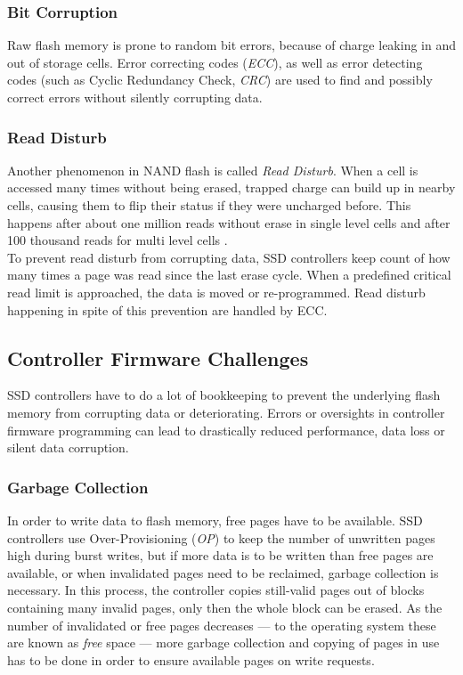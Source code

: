 \documentclass{acm_proc_article-sp}
\begin{document}
\subsubsection*{Bit Corruption}
Raw flash memory is prone to random bit errors, because of charge leaking in and out of storage cells. Error correcting codes (\emph{ECC}), as well as error detecting codes (such as Cyclic Redundancy Check, \emph{CRC}) are used to find and possibly correct errors without silently corrupting data.

\subsubsection*{Read Disturb}
Another phenomenon in NAND flash is called \emph{Read Disturb}. When a cell is accessed many times without being erased, trapped charge can build up in nearby cells, causing them to flip their status if they were uncharged before.
This happens after about one million reads without erase in single level cells and after 100 thousand reads for multi level cells \cite{cooke2007inconvenient}.
\\
To prevent read disturb from corrupting data, SSD controllers keep count of how many times a page was read since the last erase cycle. When a predefined critical read limit is approached, the data is moved or re-programmed. Read disturb happening in spite of this prevention are handled by ECC.

\subsection{Controller Firmware Challenges}
SSD controllers have to do a lot of bookkeeping to prevent the underlying flash memory from corrupting data or deteriorating. Errors or oversights in controller firmware programming can lead to drastically reduced performance, data loss or silent data corruption.

\subsubsection*{Garbage Collection}
In order to write data to flash memory, free pages have to be available. SSD controllers use Over-Provisioning (\emph{OP}) to keep the number of unwritten pages high during burst writes, but if more data is to be written than free pages are available, or when invalidated pages need to be reclaimed, garbage collection is necessary. In this process, the controller copies still-valid pages out of blocks containing many invalid pages, only then the whole block can be erased. As the number of invalidated or free pages decreases --- to the operating system these are known as \emph{free} space --- more garbage collection and copying of pages in use has to be done in order to ensure available pages on write requests.
\end{document}
